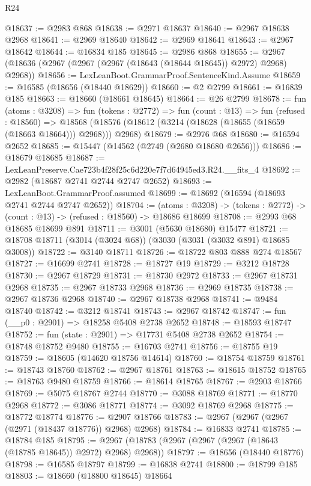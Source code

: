 \begin{lexlean}{R24}
\begin{coremodule}
@18637 := @2983 @868
@18638 := @2971 @18637
@18640 := @2967 @18638 @2968
@18641 := @2969 @18640
@18642 := @2969 @18641
@18643 := @2967 @18642
@18644 := @16834 @185
@18645 := @2986 @868
@18655 := @2967 (@18636 (@2967 (@2967 (@2967 (@18643 (@18644 @18645)) @2972) @2968) @2968))
@18656 := LexLeanBoot.GrammarProof.SentenceKind.Assume
@18659 := @16585 (@18656 (@18440 @18629))
@18660 := @2 @2799
@18661 := @16839 @185
@18663 := @18660 (@18661 @18645)
@18664 := @26 @2799
@18678 := fun (atoms : @3208) =>
  fun (tokens : @2772) =>
  fun (count : @13) =>
  fun (refused : @18560) =>
  @18568 (@18576 (@18612 (@3214 (@18628 (@18655 (@18659 (@18663 @18664))) @2968))) @2968)
@18679 := @2976 @68
@18680 := @16594 @2652
@18685 := @15447 (@14562 (@2749 (@2680 @18680 @2656)))
@18686 := @18679 @18685
@18687 := LexLeanPreserve.Cae723b4f28f25c6d220e7f7d64945ed3.R24.__fits_4
@18692 := @2982 (@18687 @2741 @2744 @2747 @2652)
@18693 := LexLeanBoot.GrammarProof.assumed
@18699 := @18692 (@16594 (@18693 @2741 @2744 @2747 @2652))
@18704 := (atoms : @3208) ->
  (tokens : @2772) -> (count : @13) -> (refused : @18560) -> @18686 @18699
@18708 := @2993 @68 @18685 @18699 @891
@18711 := @3001 (@5630 @18680) @15477
@18721 := @18708 @18711 (@3014 (@3024 @68)) (@3030 (@3031 (@3032 @891) @18685 @3008))
@18722 := @3140 @18711
@18726 := @18722 @803 @888 @274 @18567
@18727 := @16699 @2741
@18728 := @18727 @19
@18729 := @3212 @18728
@18730 := @2967 @18729
@18731 := @18730 @2972
@18733 := @2967 @18731 @2968
@18735 := @2967 @18733 @2968
@18736 := @2969 @18735
@18738 := @2967 @18736 @2968
@18740 := @2967 @18738 @2968
@18741 := @9484 @18740
@18742 := @3212 @18741
@18743 := @2967 @18742
@18747 := fun (__p0 : @2901) => @18258 @5408 @2738 @2652
@18748 := @18593 @18747
@18752 := fun (state : @2901) => @17731 @5408 @2738 @2652
@18754 := @18748 @18752 @9480
@18755 := @16703 @2741
@18756 := @18755 @19
@18759 := @18605 (@14620 @18756 @14614)
@18760 := @18754 @18759
@18761 := @18743 @18760
@18762 := @2967 @18761
@18763 := @18615 @18752
@18765 := @18763 @9480 @18759
@18766 := @18614 @18765
@18767 := @2903 @18766
@18769 := @5075 @18767 @2744
@18770 := @3088 @18769
@18771 := @18770 @2968
@18772 := @3086 @18771
@18774 := @3092 @18769 @2968
@18775 := @18772 @18774
@18776 := @2907 @18766
@18783 := @2967 (@2967 (@2967 (@2971 (@18437 @18776)) @2968) @2968)
@18784 := @16833 @2741
@18785 := @18784 @185
@18795 := @2967 (@18783 (@2967 (@2967 (@2967 (@18643 (@18785 @18645)) @2972) @2968) @2968))
@18797 := @18656 (@18440 @18776)
@18798 := @16585 @18797
@18799 := @16838 @2741
@18800 := @18799 @185
@18803 := @18660 (@18800 @18645) @18664

\end{coremodule}
\end{lexlean}
